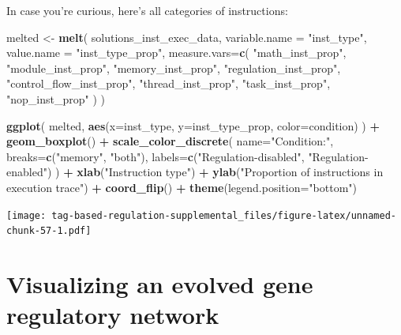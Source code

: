 \documentclass[
]{book}
\newenvironment{Shaded}{\begin{snugshade}}{\end{snugshade}}
\newcommand{\DataTypeTok}[1]{\textcolor[rgb]{0.13,0.29,0.53}{#1}}
\newcommand{\KeywordTok}[1]{\textcolor[rgb]{0.13,0.29,0.53}{\textbf{#1}}}
\newcommand{\NormalTok}[1]{#1}
\newcommand{\OperatorTok}[1]{\textcolor[rgb]{0.81,0.36,0.00}{\textbf{#1}}}
\newcommand{\StringTok}[1]{\textcolor[rgb]{0.31,0.60,0.02}{#1}}
\begin{document}
In case you're curious, here's all categories of instructions:

\begin{Shaded}
\begin{Highlighting}[]
\NormalTok{melted \textless{}{-}}\StringTok{ }\KeywordTok{melt}\NormalTok{(}
\NormalTok{  solutions\_inst\_exec\_data,}
  \DataTypeTok{variable.name =} \StringTok{"inst\_type"}\NormalTok{,}
  \DataTypeTok{value.name =} \StringTok{"inst\_type\_prop"}\NormalTok{,}
  \DataTypeTok{measure.vars=}\KeywordTok{c}\NormalTok{(}
    \StringTok{"math\_inst\_prop"}\NormalTok{,}
    \StringTok{"module\_inst\_prop"}\NormalTok{,}
    \StringTok{"memory\_inst\_prop"}\NormalTok{,}
    \StringTok{"regulation\_inst\_prop"}\NormalTok{,}
    \StringTok{"control\_flow\_inst\_prop"}\NormalTok{,}
    \StringTok{"thread\_inst\_prop"}\NormalTok{,}
    \StringTok{"task\_inst\_prop"}\NormalTok{,}
    \StringTok{"nop\_inst\_prop"}
\NormalTok{  )}
\NormalTok{)}

\KeywordTok{ggplot}\NormalTok{( melted, }\KeywordTok{aes}\NormalTok{(}\DataTypeTok{x=}\NormalTok{inst\_type, }\DataTypeTok{y=}\NormalTok{inst\_type\_prop, }\DataTypeTok{color=}\NormalTok{condition) ) }\OperatorTok{+}
\StringTok{  }\KeywordTok{geom\_boxplot}\NormalTok{() }\OperatorTok{+}
\StringTok{  }\KeywordTok{scale\_color\_discrete}\NormalTok{(}
    \DataTypeTok{name=}\StringTok{"Condition:"}\NormalTok{,}
    \DataTypeTok{breaks=}\KeywordTok{c}\NormalTok{(}\StringTok{"memory"}\NormalTok{, }\StringTok{"both"}\NormalTok{),}
    \DataTypeTok{labels=}\KeywordTok{c}\NormalTok{(}\StringTok{"Regulation{-}disabled"}\NormalTok{, }\StringTok{"Regulation{-}enabled"}\NormalTok{)}
\NormalTok{  ) }\OperatorTok{+}
\StringTok{  }\KeywordTok{xlab}\NormalTok{(}\StringTok{"Instruction type"}\NormalTok{) }\OperatorTok{+}
\StringTok{  }\KeywordTok{ylab}\NormalTok{(}\StringTok{"Proportion of instructions in execution trace"}\NormalTok{) }\OperatorTok{+}
\StringTok{  }\KeywordTok{coord\_flip}\NormalTok{() }\OperatorTok{+}
\StringTok{  }\KeywordTok{theme}\NormalTok{(}\DataTypeTok{legend.position=}\StringTok{"bottom"}\NormalTok{)}
\end{Highlighting}
\end{Shaded}

\texttt{[image: tag-based-regulation-supplemental\_files/figure-latex/unnamed-chunk-57-1.pdf]}

\hypertarget{visualizing-an-evolved-gene-regulatory-network}{%
\section{Visualizing an evolved gene regulatory network}\label{visualizing-an-evolved-gene-regulatory-network}}
\end{document}
